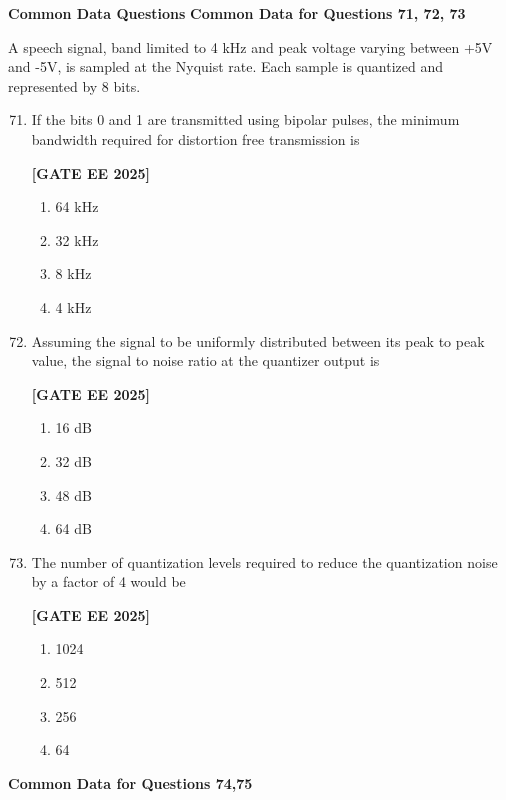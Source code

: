 \documentclass[12pt]{article}
\begin{document}
\vspace{1em}
 \large \textbf {Common Data Questions}
 \large \textbf {Common Data for Questions 71, 72, 73}
\vspace{1em}
 
A speech signal, band limited to 4 kHz and peak voltage varying between +5V and -5V, is sampled at the Nyquist rate. Each sample is quantized and represented by 8 bits.

\begin{enumerate}[leftmargin=*, label=\textbf{Q.\arabic*:}]
\setcounter{enumi}{70}

\item If the bits 0 and 1 are transmitted using bipolar pulses, the minimum bandwidth required for distortion free transmission is
 
\noindent \textbf{[GATE EE 2025]}
\begin{enumerate}
  \item 64 kHz
  \item 32 kHz
  \item 8 kHz
  \item 4 kHz
\end{enumerate}

\item Assuming the signal to be uniformly distributed between its peak to peak value, the signal to noise ratio at the quantizer output is
 
\noindent \textbf{[GATE EE 2025]}
\begin{enumerate}
  \item 16 dB
  \item 32 dB
  \item 48 dB
  \item 64 dB
\end{enumerate}

\item The number of quantization levels required to reduce the quantization noise by a factor of 4 would be
 
\noindent \textbf{[GATE EE 2025]}
\begin{enumerate}
  \item 1024
  \item 512
  \item 256
  \item 64
\end{enumerate}

\end{enumerate}

\vspace{1em}
 \large \textbf {Common Data for Questions 74,75}
\vspace{1em}
\end{document}
